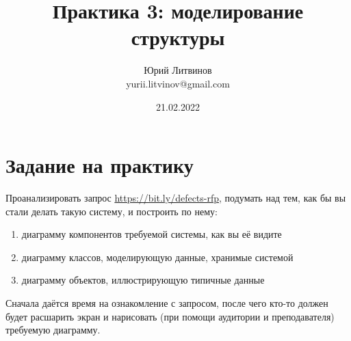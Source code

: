 \documentclass[a5paper]{article}
\title{Практика 3: моделирование структуры}
\author{Юрий Литвинов\\\small{yurii.litvinov@gmail.com}}
\date{21.02.2022}
\begin{document}
\maketitle
\thispagestyle{empty}

\section{Задание на практику}

Проанализировать запрос \url{https://bit.ly/defects-rfp}, подумать над тем, как бы вы стали делать такую систему, и построить по нему:

\begin{enumerate}
    \item диаграмму компонентов требуемой системы, как вы её видите
    \item диаграмму классов, моделирующую данные, хранимые системой
    \item диаграмму объектов, иллюстрирующую типичные данные
\end{enumerate}

Сначала даётся время на ознакомление с запросом, после чего кто-то должен будет расшарить экран и нарисовать (при помощи аудитории и преподавателя) требуемую диаграмму.
\end{document}
